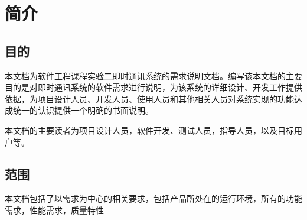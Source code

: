 \chapter{简介}
\section{目的}


本文档为软件工程课程实验二即时通讯系统的需求说明文档。编写该本文档的主要目的是对即时通讯系统的软件需求进行说明，为该系统的详细设计、开发工作提供依据，为项目设计人员、开发人员、使用人员和其他相关人员对系统实现的功能达成统一的认识提供一个明确的书面说明。

本文档的主要读者为项目设计人员，软件开发、测试人员，指导人员，以及目标用户等。

\section{范围}

本文档包括了以需求为中心的相关要求，包括产品所处在的运行环境，所有的功能需求，性能需求，质量特性
